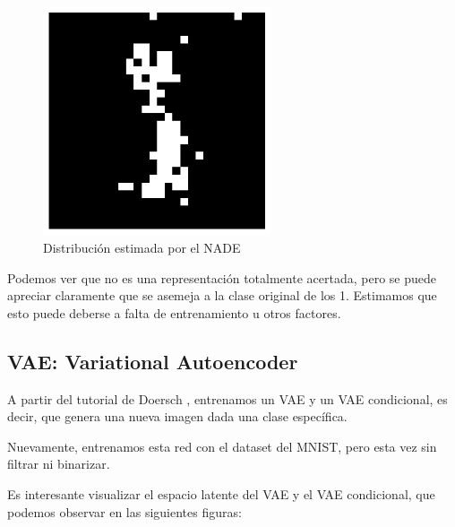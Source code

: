 \documentclass[11pt]{article}
\begin{document}
\begin{figure}[h]
    \centering
    \includegraphics[width=0.6\textwidth]{NADE/nade_generation.png}
    \caption{Distribución estimada por el NADE}
    \label{fig:nade_gen}
\end{figure}

Podemos ver que no es una representación totalmente acertada, pero se puede apreciar claramente que se asemeja a la clase original de los 1. Estimamos que esto puede deberse a falta de entrenamiento u otros factores.
\newpage
\subsection{VAE: Variational Autoencoder}

A partir del tutorial de Doersch \cite{vae}, entrenamos un VAE y un VAE condicional, es decir, que genera una nueva imagen dada una clase específica.

Nuevamente, entrenamos esta red con el dataset del MNIST, pero esta vez sin filtrar ni binarizar.

Es interesante visualizar el espacio latente del VAE y el VAE condicional, que podemos observar en las siguientes figuras:
\end{document}
